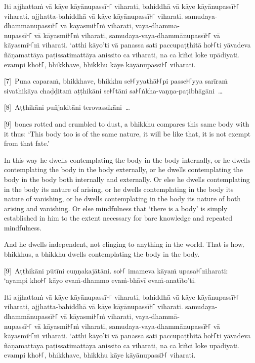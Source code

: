 Iti ajjhattaṁ vā kāye kāyānupassī꜔꜒ viharati, bahiddhā vā kāye kāyānupassī꜔꜒
viharati, ajjhatta-bahiddhā vā kāye kāyānupassī꜔꜒ viharati. samudaya-dhammānupassī꜔꜒
vā kāyasmi꜔꜒ṁ viharati, vaya-dhammā-\\
nupassī꜔꜒ vā kāyasmi꜔꜒ṁ viharati, samudaya-vaya-dhammānupassī꜔꜒ vā kāyasmi꜔꜒ṁ viharati.
‘atthi kāyo’ti vā panassa sati paccupaṭṭhitā ho꜔꜒ti yāvadeva ñāṇamattāya
paṭissatimattāya anissito ca viharati, na ca kiñci loke upādiyati. evampi kho꜔꜒,
bhikkhave, bhikkhu kāye kāyānupassī꜔꜒ viharati.

[7]~Puna caparaṁ, bhikkhave, bhikkhu se꜔꜒yyathā꜔꜒pi passe꜔꜒yya sarīraṁ sivathikāya
chaḍḍitaṁ aṭṭhikāni se꜔꜒tāni sa꜔꜒ṅkha-vaṇṇa-paṭibhāgāni~\ldots{}

[8]~Aṭṭhikāni puñjakitāni terovassikāni~\ldots{}

\englishPage

[9]~bones rotted and crumbled to dust, a bhikkhu compares this same
body with it thus: ‘This body too is of the same nature, it will be like that,
it is not exempt from that fate.’

In this way he dwells contemplating the body in the body internally, or he
dwells contemplating the body in the body externally, or he dwells contemplating
the body in the body both internally and externally. Or else he dwells
contemplating in the body its nature of arising, or he dwells contemplating in
the body its nature of vanishing, or he dwells contemplating in the body its
nature of both arising and vanishing. Or else mindfulness that ‘there is a body’
is simply established in him to the extent necessary for bare knowledge and
repeated mindfulness.

And he dwells independent, not clinging to anything in the world. That is how,
bhikkhus, a bhikkhu dwells contemplating the body in the body.



\paliPage

[9]~Aṭṭhikāni pūtīni cuṇṇakajātāni. so꜔꜒ imameva kāyaṁ upasa꜔꜒ṁharati: ‘ayampi kho꜔꜒
kāyo evaṁ-dhammo evaṁ-bhāvī evaṁ-anatīto’ti.

Iti ajjhattaṁ vā kāye kāyānupassī꜔꜒ viharati, bahiddhā vā kāye kāyānupassī꜔꜒
viharati, ajjhatta-bahiddhā vā kāye kāyānupassī꜔꜒ viharati. samudaya-dhammānupassī꜔꜒
vā kāyasmi꜔꜒ṁ viharati, vaya-dhammā-\\
nupassī꜔꜒ vā kāyasmi꜔꜒ṁ viharati, samudaya-vaya-dhammānupassī꜔꜒ vā kāyasmi꜔꜒ṁ viharati.
‘atthi kāyo’ti vā panassa sati paccupaṭṭhitā ho꜔꜒ti yāvadeva ñāṇamattāya
paṭissatimattāya anissito ca viharati, na ca kiñci loke upādiyati. evampi kho꜔꜒,
bhikkhave, bhikkhu kāye kāyānupassī꜔꜒ viharati.

